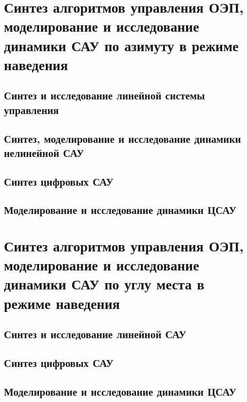 \section{Синтез алгоритмов управления ОЭП, моделирование и исследование динамики САУ по азимуту в режиме наведения} \label{ch:ch4/sect4}


\subsection{Синтез и исследование линейной системы управления} \label{subsec:ch4/sect4/sub1}


\subsection{Синтез, моделирование и исследование динамики нелинейной САУ} \label{subsec:ch4/sect4/sub2}


\subsection{Синтез цифровых САУ } \label{subsec:ch4/sect4/sub3}


\subsection{Моделирование и исследование динамики ЦСАУ} \label{subsec:ch4/sect4/sub4}


\section{Синтез алгоритмов управления ОЭП, моделирование и исследование динамики САУ  по углу места  в режиме наведения} \label{ch:ch4/sect5}


\subsection{Синтез и исследование линейной САУ} \label{subsec:ch4/sect5/sub1}


\subsection{Синтез цифровых САУ } \label{subsec:ch4/sect5/sub2}


\subsection{Моделирование и исследование динамики ЦСАУ} \label{subsec:ch4/sect5/sub3}



